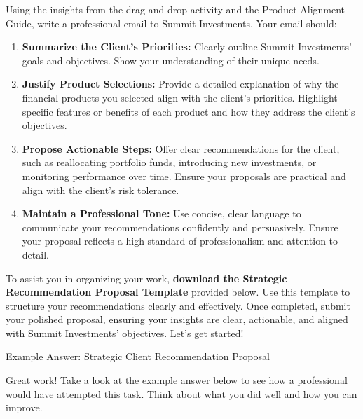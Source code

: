 \documentclass[11pt]{article}
\begin{document}
Using the insights from the drag-and-drop activity and the Product Alignment
Guide, write a professional email to Summit Investments. Your email should:
\begin{enumerate}[leftmargin=1.5em, itemsep=3pt]
  \item \textbf{Summarize the Client's Priorities:} Clearly outline Summit
  Investments' goals and objectives. Show your understanding of their unique
  needs.
  \item \textbf{Justify Product Selections:} Provide a detailed explanation of
  why the financial products you selected align with the client's priorities.
  Highlight specific features or benefits of each product and how they address
  the client's objectives.
  \item \textbf{Propose Actionable Steps:} Offer clear recommendations for the
  client, such as reallocating portfolio funds, introducing new investments,
  or monitoring performance over time. Ensure your proposals are practical and
  align with the client's risk tolerance.
  \item \textbf{Maintain a Professional Tone:} Use concise, clear language to
  communicate your recommendations confidently and persuasively. Ensure your
  proposal reflects a high standard of professionalism and attention to
  detail.
\end{enumerate}

To assist you in organizing your work, \textbf{download the Strategic
Recommendation Proposal Template} provided below. Use this template to
structure your recommendations clearly and effectively. Once completed, submit
your polished proposal, ensuring your insights are clear, actionable, and
aligned with Summit Investments' objectives. Let's get started!\par\medskip



\newpage
{\fontsize{26}{30}\selectfont Example Answer: Strategic Client Recommendation Proposal}\par\bigskip

Great work! Take a look at the example answer below to see how a professional
would have attempted this task. Think about what you did well and how you can
improve.
\end{document}
